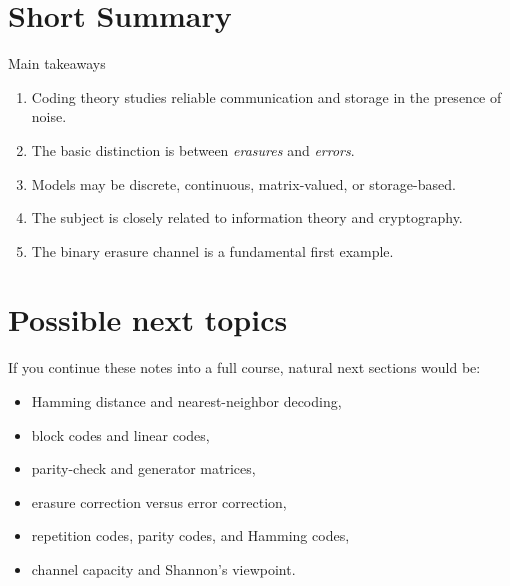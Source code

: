 \documentclass[11pt]{article}
\begin{document}
\section{Short Summary}

\begin{summarybox}{Main takeaways}
\begin{enumerate}[leftmargin=2em]
  \item Coding theory studies reliable communication and storage in the presence of noise.
  \item The basic distinction is between \emph{erasures} and \emph{errors}.
  \item Models may be discrete, continuous, matrix-valued, or storage-based.
  \item The subject is closely related to information theory and cryptography.
  \item The binary erasure channel is a fundamental first example.
\end{enumerate}
\end{summarybox}

\section*{Possible next topics}

If you continue these notes into a full course, natural next sections would be:
\begin{itemize}[leftmargin=2em]
  \item Hamming distance and nearest-neighbor decoding,
  \item block codes and linear codes,
  \item parity-check and generator matrices,
  \item erasure correction versus error correction,
  \item repetition codes, parity codes, and Hamming codes,
  \item channel capacity and Shannon's viewpoint.
\end{itemize}
\end{document}
